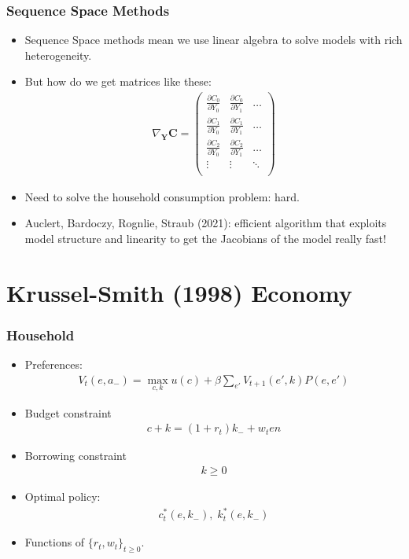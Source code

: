\documentclass[english,xcolor=svgnames]{beamer}
\begin{document}
\begin{frame}
    \frametitle{Sequence Space Methods}
    \begin{itemize}
    	\item Sequence Space methods mean we use linear algebra to solve models with rich heterogeneity. 
        \item But how do we get matrices like these: 
        \begin{align*}
            \nabla_{\bm{Y}}\pmb{\mathbf{C}} = 
            \begin{pmatrix}
                \frac{\partial C_{0}}{\partial Y_0} & \frac{\partial C_{0}}{\partial Y_1} & \hdots \\
                \frac{\partial C_{1}}{\partial Y_0} & \frac{\partial C_{1}}{\partial Y_1} & \hdots \\
                \frac{\partial C_{2}}{\partial Y_0} & \frac{\partial C_{2}}{\partial Y_1} & \hdots \\
                \vdots & \vdots & \ddots \\
            \end{pmatrix}
        \end{align*}
        \item Need to solve the household consumption problem: hard.
        \item Auclert, Bardoczy, Rognlie, Straub (2021): efficient algorithm that exploits model structure and linearity to get the Jacobians of the model really fast!
    \end{itemize}
\end{frame}


\section{Krussel-Smith (1998) Economy}

\begin{frame}
    \frametitle{Household}
    \begin{itemize}
        \item Preferences:
        \begin{align*}
        	V_t(e,a_{-}) = \max_{c,k} u(c) + \beta \sum_{e'} V_{t+1}(e',k)P(e,e')
        \end{align*}
        \item Budget constraint
        \begin{align*}
        	c+k = (1+r_t)k_{-}+w_t e n
        \end{align*}
        \item Borrowing constraint
        \begin{align*}
        	k \ge 0
        \end{align*}
        \item Optimal policy:
        \begin{align*}
        	c_t^*(e,k_{-}),\; k_t^*(e,k_{-})
        \end{align*}
        \item Functions of $\{r_t,w_t\}_{t\ge 0 }$.
	\end{itemize}
\end{frame}
\end{document}
